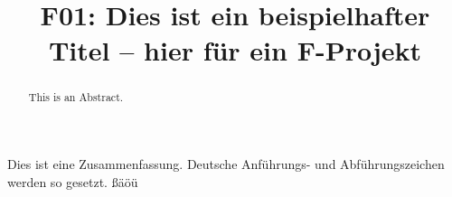 \documentclass[german,report]{tudo-raumplanung-thesis-report}
\title{F01: Dies ist ein beispielhafter Titel -- hier für ein F-Projekt}
\begin{document}
\maketitle


\begin{abstract}
  This is an Abstract. \blindtext
\end{abstract}

\begin{abstract-ger}
  Dies ist eine Zusammenfassung. \glqq Deutsche Anführungs- und Abführungszeichen werden so gesetzt\grqq{}.  ßäöü \blindtext
\end{abstract-ger}

\tableofcontents
\makelistfigures
\cleardoublepage
\raggedbottom

\begin{abbreviations}
\end{abbreviations}









\makebibliography


\makeappendix


\cleardoublepage

\end{document}

